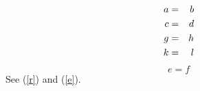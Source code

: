 \documentclass{article}
\begin{document}
\begin{eqnarray}
a&=&b \cr
c&=&d\label{r}\\
g&=&h \cr
k&=&l
\end{eqnarray}
\begin{equation}e=f\label{e}\end{equation}
See (\ref{r}) and (\ref{e}).
\end{document}
